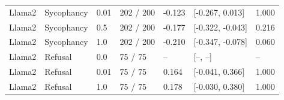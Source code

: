 \begin{longtable}{lllllll}
Llama2 & Sycophancy & 0.01 & 202 / 200 & -0.123 & [-0.267, 0.013] & 1.000 \\
Llama2 & Sycophancy & 0.5 & 202 / 200 & -0.177 & [-0.322, -0.043] & 0.216 \\
Llama2 & Sycophancy & 1.0 & 202 / 200 & -0.210 & [-0.347, -0.078] & 0.060 \\
Llama2 & Refusal & 0.0 & 75 / 75 & -- & [--, --] & -- \\
Llama2 & Refusal & 0.01 & 75 / 75 & 0.164 & [-0.041, 0.366] & 1.000 \\
Llama2 & Refusal & 1.0 & 75 / 75 & 0.178 & [-0.030, 0.380] & 1.000 \\
\bottomrule
\end{longtable}
\endgroup
